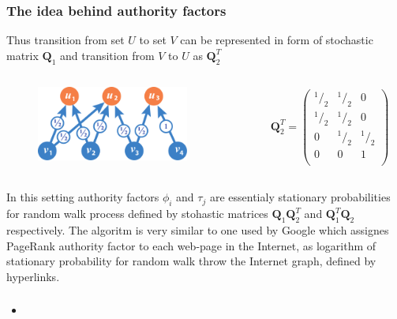 \documentclass{beamer}
\newcommand{\mQ}{\mathbf{Q}}
\newcommand*\rfrac[2]{{}^{#1}\!/_{#2}}
\begin{document}
\begin{frame}
\frametitle{The idea behind authority factors}
Thus transition from set $U$ to set $V$ can be represented in form of
stochastic matrix $\mQ_1$ and transition from $V$ to $U$ as $\mQ_2^T$
\begin{columns}[T] %
\begin{column}{.48\textwidth}
\begin{figure}[h] 
    \includegraphics[width=5cm]{DemoGraphQ2.pdf}
\end{figure}
\end{column}%
\hfill%
\begin{column}{.48\textwidth}
\begin{eqnarray*}
\mQ_2^T = \left(
 \begin{array}{ccc}
    \rfrac{1}{2}& \rfrac{1}{2}& 0\\
    \rfrac{1}{2}& \rfrac{1}{2}& 0\\
    0& \rfrac{1}{2}& \rfrac{1}{2}\\
    0& 0& 1\\
  \end{array}
   \right)
\end{eqnarray*}
\end{column}%
\end{columns}
In this setting authority factors $\phi_i$ and $\tau_j$ are essentialy
stationary probabilities for random walk process defined by
stohastic matrices $\mQ_1\mQ_2^T$ and $\mQ_1^T\mQ_2$ respectively.
The algoritm is very similar to one used by Google which assignes PageRank
authority factor to each web-page in the Internet, as logarithm of stationary
probability for random walk throw the Internet graph, defined by hyperlinks.
\end{frame}



\begin{frame}[allowframebreaks]


\end{frame}

\begin{frame}
\frametitle{}
\framesubtitle{}
\begin{itemize}
  \item 
\end{itemize}
\end{frame}
\end{document}
